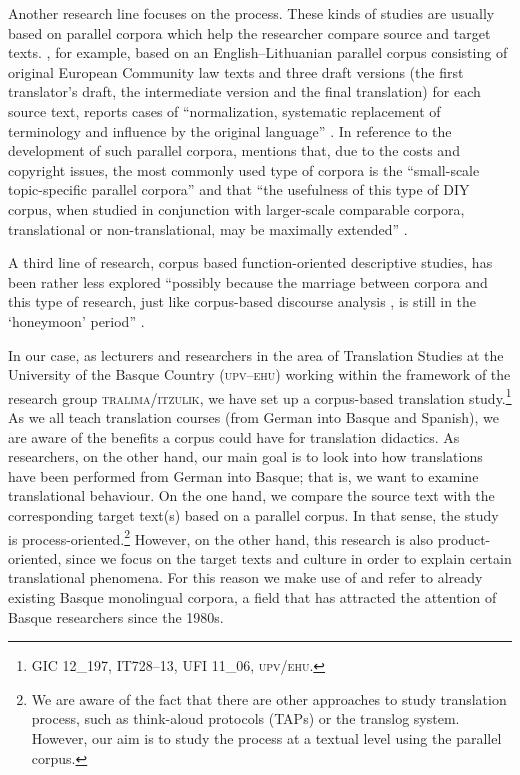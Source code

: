 \documentclass[output=paper]{LSP/langsci}
\begin{document}
Another research line focuses on the process. These kinds of studies are usually based on parallel corpora which help the researcher compare source and target texts. \citet{Utka2004}, for example, based on an English--Lithuanian parallel corpus consisting of original European Community law texts and three draft versions (the first translator's draft, the intermediate version and the final translation) for each source text, reports cases of “normalization, systematic replacement of terminology and influence by the original language” \citep[246]{Xiao2009}. In reference to the development of such parallel corpora, \citet{Ji2010} mentions that, due to the costs and copyright issues, the most commonly used type of corpora is the “small-scale topic-specific parallel corpora” \citep[6]{Ji2010} and that “the usefulness of this type of DIY corpus, when studied in conjunction with larger-scale comparable corpora, translational or non-translational, may be maximally extended” \citep[6]{Ji2010}.

\enlargethispage{1\baselineskip}
A third line of research, corpus based function-oriented descriptive studies, has been rather less explored “possibly because the marriage between corpora and this type of research, just like corpus-based discourse analysis \citep[e.g.][]{Baker2006}, is still in the `honeymoon' period” \citep[247]{Xiao2009}.

In our case, as lecturers and researchers in the area of Translation Studies at the University of the Basque Country (\textsc{upv}--\textsc{ehu}) working within the framework of the research group \textsc{tralima}/\textsc{itzulik}, we have set up a corpus-based translation study.\footnote{GIC 12\_197, IT728--13, UFI 11\_06, \textsc{upv}/\textsc{ehu}.} As we all teach translation courses (from German into Basque and Spanish), we are aware of the benefits a corpus could have for translation didactics. As researchers, on the other hand, our main goal is to look into how translations have been performed from German into Basque; that is, we want to examine translational behaviour. On the one hand, we compare the source text with the corresponding target text(s) based on a parallel corpus. In that sense, the study is process-oriented.\footnote{We are aware of the fact that there are other approaches to study translation process, such as think-aloud protocols (TAPs) or the translog system. However, our aim is to study the process at a textual level using the parallel corpus.} However, on the other hand, this research is also product-oriented, since we focus on the target texts and culture in order to explain certain translational phenomena. For this reason we make use of and refer to already existing Basque monolingual corpora, a field that has attracted the attention of Basque researchers since the 1980s.
\end{document}
